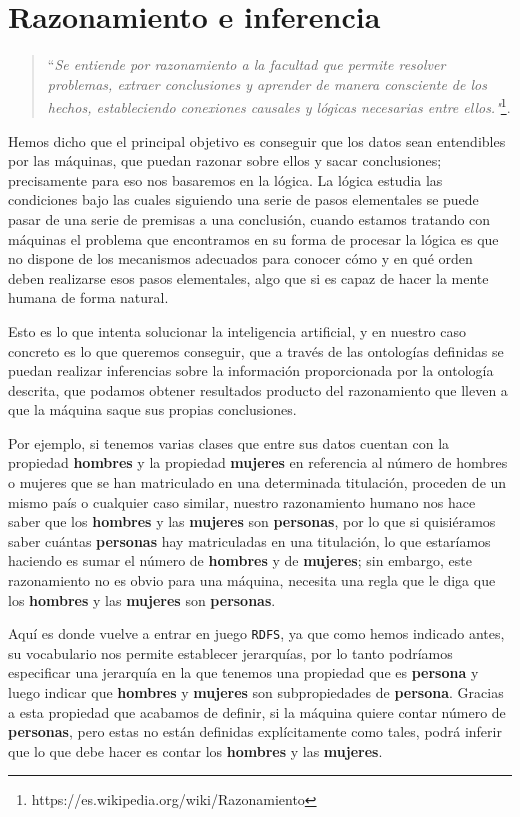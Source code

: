 \section{Razonamiento e inferencia}

\begin{quote}``\textit{Se entiende por razonamiento a la facultad que permite resolver problemas, extraer conclusiones y aprender de manera consciente de los hechos, estableciendo conexiones causales y lógicas necesarias entre ellos."}\footnote{https://es.wikipedia.org/wiki/Razonamiento}.\end{quote}

\bigskip
Hemos dicho que el principal objetivo es conseguir que los datos sean entendibles por las máquinas, que puedan razonar sobre ellos y sacar conclusiones; precisamente para eso nos basaremos en la lógica. La lógica estudia las condiciones bajo las cuales siguiendo una serie de pasos elementales se puede pasar de una serie de premisas a una conclusión, cuando estamos tratando con máquinas el problema que encontramos en su forma de procesar la lógica es que no dispone de los mecanismos adecuados para conocer cómo y en qué orden deben realizarse esos pasos elementales, algo que si es capaz de hacer la mente humana de forma natural. 

\bigskip
Esto es lo que intenta solucionar la inteligencia artificial, y en nuestro caso concreto es lo que queremos conseguir, que a través de las ontologías definidas se puedan realizar inferencias sobre la información proporcionada por la ontología descrita, que podamos obtener resultados producto del razonamiento que lleven a que la máquina saque sus propias conclusiones.

\bigskip
Por ejemplo, si tenemos varias clases que entre sus datos cuentan con la propiedad \textbf{hombres} y la propiedad \textbf{mujeres} en referencia al número de hombres o mujeres que se han matriculado en una determinada titulación, proceden de un mismo país o cualquier caso similar, nuestro razonamiento humano nos hace saber que los \textbf{hombres} y las \textbf{mujeres} son \textbf{personas}, por lo que si quisiéramos saber cuántas \textbf{personas} hay matriculadas en una titulación, lo que estaríamos haciendo es sumar el número de \textbf{hombres} y de \textbf{mujeres}; sin embargo, este razonamiento no es obvio para una máquina, necesita una regla que le diga que los \textbf{hombres} y las \textbf{mujeres} son \textbf{personas}.

\bigskip
Aquí es donde vuelve a entrar en juego {\tt RDFS}, ya que como hemos indicado antes, su vocabulario nos permite establecer jerarquías, por lo tanto podríamos especificar una jerarquía en la que tenemos una propiedad que es \textbf{persona} y luego indicar que \textbf{hombres} y \textbf{mujeres} son subpropiedades de \textbf{persona}. Gracias a esta propiedad que acabamos de definir, si la máquina quiere contar número de \textbf{personas}, pero estas no están definidas explícitamente como tales, podrá inferir que lo que debe hacer es contar los \textbf{hombres} y las \textbf{mujeres}.